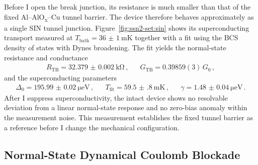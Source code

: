    Before I open the break junction, its resistance is much smaller than that of the fixed Al--AlO\textsubscript{x}--Cu tunnel barrier. The device therefore behaves approximately as a single SIN tunnel junction. Figure~\ref{fig:ssn2-set:sin} shows its superconducting transport measured at $T_\mathrm{bath}=\qty{36(1)}{\milli\kelvin}$ together with a fit using the BCS density of states with Dynes broadening. The fit yields the normal-state resistance and conductance
    \begin{align}
        R_\mathrm{TB} = \qty{32.379(2)}{\kilo\ohm}\,, &&
        G_\mathrm{TB} = 0.39859(3)\,G_0\,,
        \label{eq:ssn-set:dynamic:intact-normal}
    \end{align}
    and the superconducting parameters
    \begin{align}
        \Delta_0 = \qty{195.99(2)}{\micro\electronvolt}\,, &&
        T_\mathrm{fit} = \qty{59.5(8)}{\milli\kelvin}\,, &&
        \gamma = \qty{1.48(4)}{\micro\electronvolt}\,.
        \label{eq:ssn-set:dynamic:intact-superconducting}
    \end{align}
    After I suppress superconductivity, the intact device shows no resolvable deviation from a linear normal-state response and no zero-bias anomaly within the measurement noise. This measurement establishes the fixed tunnel barrier as a reference before I change the mechanical configuration.

    \subsection*{Normal-State Dynamical Coulomb Blockade}

